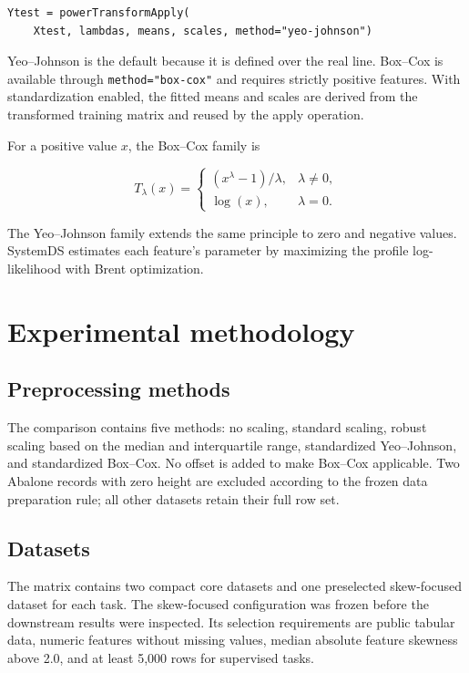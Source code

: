 \documentclass[11pt,a4paper]{article}
\begin{document}
\begin{verbatim}
Ytest = powerTransformApply(
    Xtest, lambdas, means, scales, method="yeo-johnson")
\end{verbatim}

Yeo--Johnson is the default because it is defined over the real line. Box--Cox
is available through \texttt{method="box-cox"} and requires strictly positive
features. With standardization enabled, the fitted means and scales are derived
from the transformed training matrix and reused by the apply operation.

For a positive value $x$, the Box--Cox family is

\begin{equation}
T_{\lambda}(x)=
\begin{cases}
(x^{\lambda}-1)/\lambda, & \lambda \neq 0,\\
\log(x), & \lambda=0.
\end{cases}
\end{equation}

The Yeo--Johnson family extends the same principle to zero and negative values.
SystemDS estimates each feature's parameter by maximizing the profile
log-likelihood with Brent optimization.

\section{Experimental methodology}

\subsection{Preprocessing methods}

The comparison contains five methods: no scaling, standard scaling, robust
scaling based on the median and interquartile range, standardized Yeo--Johnson,
and standardized Box--Cox. No offset is added to make Box--Cox applicable.
Two Abalone records with zero height are excluded according to the frozen data
preparation rule; all other datasets retain their full row set.

\subsection{Datasets}

The matrix contains two compact core datasets and one preselected skew-focused
dataset for each task. The skew-focused configuration was frozen before the
downstream results were inspected. Its selection requirements are public
tabular data, numeric features without missing values, median absolute feature
skewness above 2.0, and at least 5,000 rows for supervised tasks.
\end{document}
